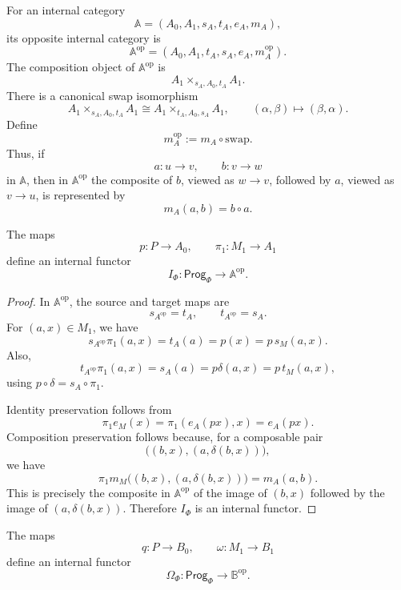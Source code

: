 \begin{definition}
\label{def:opposite-internal-category}
For an internal category
\[
\mathbb A=(A_0,A_1,s_A,t_A,e_A,m_A),
\]
its opposite internal category is
\[
\mathbb A^{\mathrm{op}}
=
(A_0,A_1,t_A,s_A,e_A,m_A^{\mathrm{op}}).
\]
The composition object of \(\mathbb A^{\mathrm{op}}\) is
\[
A_1\times_{s_A,A_0,t_A}A_1.
\]
There is a canonical swap isomorphism
\[
A_1\times_{s_A,A_0,t_A}A_1
\cong
A_1\times_{t_A,A_0,s_A}A_1,
\qquad
(\alpha,\beta)\mapsto(\beta,\alpha).
\]
Define
\[
m_A^{\mathrm{op}}
:=
m_A\circ \mathrm{swap}.
\]
Thus, if
\[
a:u\to v,
\qquad
b:v\to w
\]
in \(\mathbb A\), then in \(\mathbb A^{\mathrm{op}}\) the composite of \(b\), viewed as \(w\to v\), followed by \(a\), viewed as \(v\to u\), is represented by
\[
m_A(a,b)=b\circ a.
\]
\end{definition}

\begin{proposition}
\label{prop:input-labelling-functor}
The maps
\[
p:P\to A_0,
\qquad
\pi_1:M_1\to A_1
\]
define an internal functor
\[
I_\Phi:\mathsf{Prog}_\Phi\to\mathbb A^{\mathrm{op}}.
\]
\end{proposition}

\begin{proof}
In \(\mathbb A^{\mathrm{op}}\), the source and target maps are
\[
s_{A^{\mathrm{op}}}=t_A,
\qquad
t_{A^{\mathrm{op}}}=s_A.
\]
For \((a,x)\in M_1\), we have
\[
s_{A^{\mathrm{op}}}\pi_1(a,x)
=
t_A(a)
=
p(x)
=
p\,s_M(a,x).
\]
Also,
\[
t_{A^{\mathrm{op}}}\pi_1(a,x)
=
s_A(a)
=
p\delta(a,x)
=
p\,t_M(a,x),
\]
using \(p\circ\delta=s_A\circ\pi_1\).

Identity preservation follows from
\[
\pi_1e_M(x)
=
\pi_1(e_A(px),x)
=
e_A(px).
\]
Composition preservation follows because, for a composable pair
\[
\bigl((b,x),(a,\delta(b,x))\bigr),
\]
we have
\[
\pi_1m_M\bigl((b,x),(a,\delta(b,x))\bigr)
=
m_A(a,b).
\]
This is precisely the composite in \(\mathbb A^{\mathrm{op}}\) of the image of \((b,x)\) followed by the image of \((a,\delta(b,x))\). Therefore \(I_\Phi\) is an internal functor.
\end{proof}

\begin{theorem}
\label{thm:output-labelling-functor}
The maps
\[
q:P\to B_0,
\qquad
\omega:M_1\to B_1
\]
define an internal functor
\[
\Omega_\Phi:\mathsf{Prog}_\Phi\to\mathbb B^{\mathrm{op}}.
\]
\end{theorem}

